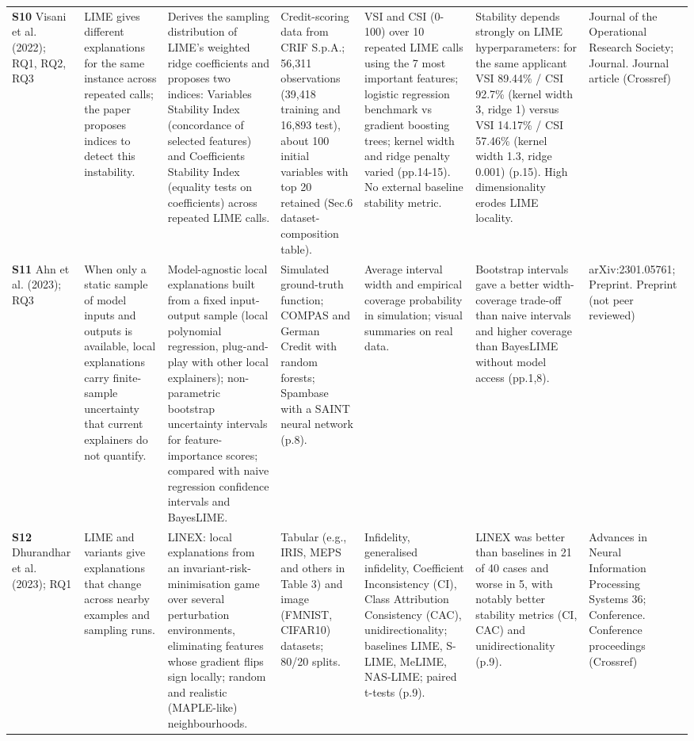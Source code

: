 \begin{longtable}{@{}P{1.55cm}P{2.9cm}P{4.5cm}P{3.2cm}P{3.4cm}P{4.6cm}P{3.6cm}@{}}
\textbf{S10} \cite{S10} Visani et al. (2022); RQ1, RQ2, RQ3 & LIME gives different explanations for the same instance across repeated calls; the paper proposes indices to detect this instability. & Derives the sampling distribution of LIME's weighted ridge coefficients and proposes two indices: Variables Stability Index (concordance of selected features) and Coefficients Stability Index (equality tests on coefficients) across repeated LIME calls. & Credit-scoring data from CRIF S.p.A.; 56,311 observations (39,418 training and 16,893 test), about 100 initial variables with top 20 retained (Sec.6 dataset-composition table). & VSI and CSI (0-100) over 10 repeated LIME calls using the 7 most important features; logistic regression benchmark vs gradient boosting trees; kernel width and ridge penalty varied (pp.14-15). No external baseline stability metric. & Stability depends strongly on LIME hyperparameters: for the same applicant VSI 89.44\% /\allowbreak{} CSI 92.7\% (kernel width 3, ridge 1) versus VSI 14.17\% /\allowbreak{} CSI 57.46\% (kernel width 1.3, ridge 0.001) (p.15). High dimensionality erodes LIME locality. & Journal of the Operational Research Society; Journal. Journal article (Crossref) \\
\textbf{S11} \cite{S11} Ahn et al. (2023); RQ3 & When only a static sample of model inputs and outputs is available, local explanations carry finite-sample uncertainty that current explainers do not quantify. & Model-agnostic local explanations built from a fixed input-output sample (local polynomial regression, plug-and-play with other local explainers); non-parametric bootstrap uncertainty intervals for feature-importance scores; compared with naive regression confidence intervals and BayesLIME. & Simulated ground-truth function; COMPAS and German Credit with random forests; Spambase with a SAINT neural network (p.8). & Average interval width and empirical coverage probability in simulation; visual summaries on real data. & Bootstrap intervals gave a better width-coverage trade-off than naive intervals and higher coverage than BayesLIME without model access (pp.1,8). & arXiv:2301.05761; Preprint. Preprint (not peer reviewed) \\
\textbf{S12} \cite{S12} Dhurandhar et al. (2023); RQ1 & LIME and variants give explanations that change across nearby examples and sampling runs. & LINEX: local explanations from an invariant-risk-minimisation game over several perturbation environments, eliminating features whose gradient flips sign locally; random and realistic (MAPLE-like) neighbourhoods. & Tabular (e.g., IRIS, MEPS and others in Table 3) and image (FMNIST, CIFAR10) datasets; 80/\allowbreak{}20 splits. & Infidelity, generalised infidelity, Coefficient Inconsistency (CI), Class Attribution Consistency (CAC), unidirectionality; baselines LIME, S-LIME, MeLIME, NAS-LIME; paired t-tests (p.9). & LINEX was better than baselines in 21 of 40 cases and worse in 5, with notably better stability metrics (CI, CAC) and unidirectionality (p.9). & Advances in Neural Information Processing Systems 36; Conference. Conference proceedings (Crossref) \\

\end{longtable}
